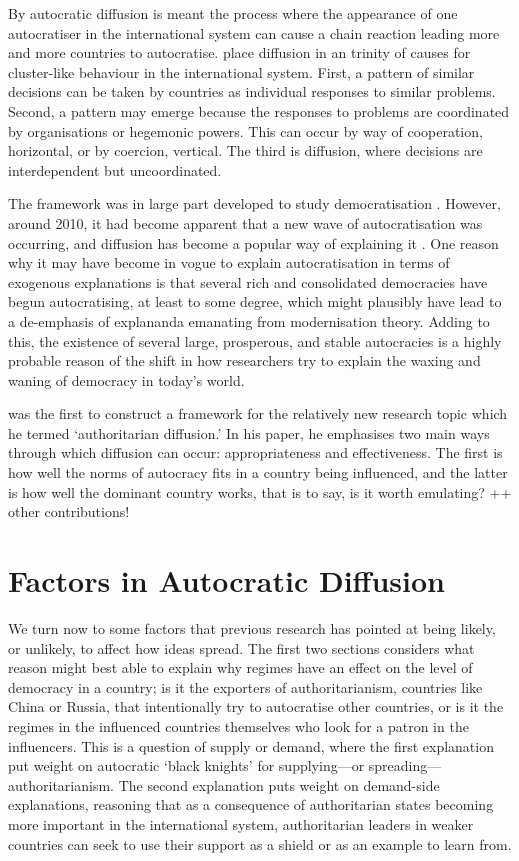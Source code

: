 By autocratic diffusion is meant the process where the appearance of one autocratiser in the international system can cause a chain reaction leading more and more countries to autocratise. \citet{elkins_waves_2005} place diffusion in an trinity of causes for cluster-like behaviour in the international system. First, a pattern of similar decisions can be taken by countries as individual responses to similar problems. Second, a pattern may emerge because the responses to problems are coordinated by organisations or hegemonic powers. This can occur by way of cooperation, horizontal, or by coercion, vertical. The third is diffusion, where decisions are interdependent but uncoordinated. 

The framework was in large part developed to study democratisation \citep{elkins_waves_2005, huntington_third_1991}. However, around 2010, it had become apparent that a new wave of autocratisation was occurring, and diffusion has become a popular way of explaining it \citep{ambrosio_constructing_2010, gelman_authoritarian_2008, lankina_authoritarian_2016, weyland_autocratic_2017}. One reason why it may have become in vogue to explain autocratisation in terms of exogenous explanations is that several rich and consolidated democracies have begun autocratising, at least to some degree, which might plausibly have lead to a de-emphasis of explananda emanating from modernisation theory. Adding to this, the existence of several large, prosperous, and stable autocracies is a highly probable reason of the shift in how researchers try to explain the waxing and waning of democracy in today's world. 

\citet{ambrosio_constructing_2010} was the first to construct a framework for the relatively new research topic which he termed `authoritarian diffusion.' In his paper, he emphasises two main ways through which diffusion can occur: appropriateness and effectiveness. The first is how well the norms of autocracy fits in a country being influenced, and the latter is how well the dominant country works, that is to say, is it worth emulating? ++ other contributions!

\section{Factors in Autocratic Diffusion}
We turn now to some factors that previous research has pointed at being likely, or unlikely, to affect how ideas spread.  The first two sections considers what reason might best able to explain why regimes have an effect on the level of democracy in a country; is it the exporters of authoritarianism, countries like China or Russia, that intentionally try to autocratise other countries, or is it the regimes in the influenced countries themselves who look for a patron in the influencers. This is a question of supply or demand, where the first explanation put weight on autocratic `black knights' for supplying---or spreading---authoritarianism. The second explanation puts weight on demand-side explanations, reasoning that as a consequence of authoritarian states becoming more important in the international system, authoritarian leaders in weaker countries can seek to use their support as a shield or as an example to learn from. 

